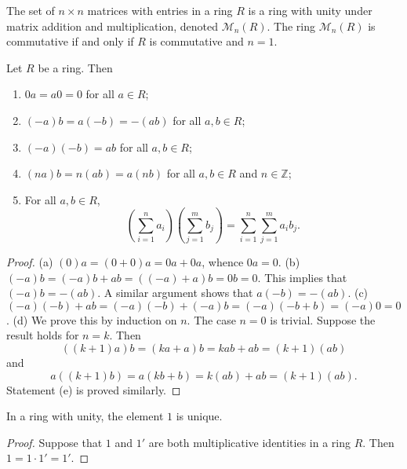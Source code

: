 \begin{example}
    The set of \(n \times n\) matrices with entries in a ring \(R\) is a ring with unity under matrix addition and multiplication, denoted \(\mathcal{M}_n(R)\). The ring \(\mathcal{M}_n(R)\) is commutative if and only if \(R\) is commutative and \(n = 1\).
\end{example}

\begin{theorem}
    Let \(R\) be a ring. Then
    \begin{enumerate}[label=(\alph*)]
        \item \(0a = a0 = 0\) for all \(a \in R\);
        \item \((-a)b = a(-b) = -(ab)\) for all \(a, b \in R\);
        \item \((-a)(-b) = ab\) for all \(a, b \in R\);
        \item \((na)b = n(ab) = a(nb)\) for all \(a, b \in R\) and \(n \in \mathbb{Z}\);
        \item For all \(a, b \in R\),
        \[
            \left(\sum_{i=1}^{n} a_i\right)\left(\sum_{j=1}^{m} b_j\right) = \sum_{i=1}^{n} \sum_{j=1}^{m} a_i b_j.
        \]
    \end{enumerate}
\end{theorem}

\begin{proof}
    (a) \((0)a = (0 + 0)a = 0a + 0a\), whence \(0a = 0\). (b) \((-a)b = (-a)b + ab = ((-a) + a)b = 0b = 0\). This implies that \((-a)b = -(ab)\). A similar argument shows that \(a(-b) = -(ab)\). (c) \((-a)(-b) + ab = (-a)(-b) + (-a)b = (-a)(-b + b) = (-a)0 = 0\). (d) We prove this by induction on \(n\). The case \(n = 0\) is trivial. Suppose the result holds for \(n = k\). Then
    \[
        ((k + 1)a)b = (ka + a)b = kab + ab = (k+1)(ab)
    \]
    and
    \[
        a((k + 1)b) = a(kb + b) = k(ab) + ab = (k+1)(ab).
    \]
    Statement (e) is proved similarly.
\end{proof}

\begin{theorem}
    In a ring with unity, the element \(1\) is unique.
\end{theorem}

\begin{proof}
    Suppose that \(1\) and \(1'\) are both multiplicative identities in a ring \(R\). Then \(1 = 1 \cdot 1' = 1'\).
\end{proof}

